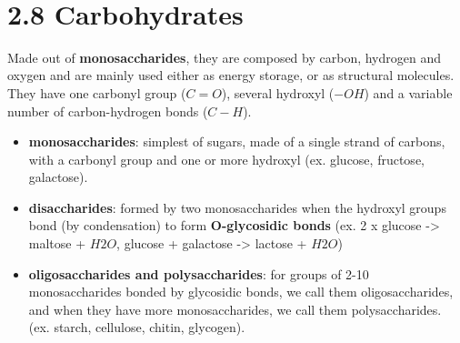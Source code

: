 \documentclass[a4paper,landscape,10pt]{cheatsheet}
\begin{document}
\hfil\\
\section*{2.8 Carbohydrates}
Made out of \textbf{monosaccharides}, they are composed by carbon, hydrogen and oxygen and are mainly used either as
energy storage, or as structural molecules.\\
They have one carbonyl group ($C=O$), several hydroxyl ($-OH$) and a variable number of carbon-hydrogen bonds ($C-H$).\\
\begin{itemize}
  \item \textbf{monosaccharides}: simplest of sugars, made of a single strand of carbons, with a carbonyl group and one
        or more hydroxyl (ex. glucose, fructose, galactose).
  \item \textbf{disaccharides}: formed by two monosaccharides when the hydroxyl groups bond (by condensation) to form
        \textbf{O-glycosidic bonds} (ex. 2 x glucose -> maltose + $H2O$, glucose + galactose -> lactose + $H2O$)
  \item \textbf{oligosaccharides and polysaccharides}: for groups of 2-10 monosaccharides bonded by glycosidic bonds, we
        call them oligosaccharides, and when they have more monosaccharides, we call them polysaccharides. (ex. starch,
        cellulose, chitin, glycogen).
\end{itemize}

\hfill\\
\end{document}
